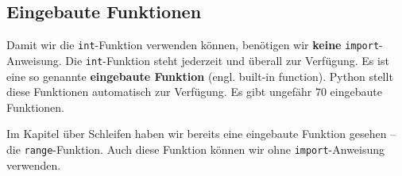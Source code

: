 \subsection{Eingebaute Funktionen}

Damit wir die \lstinline[language={python3}]{int}-Funktion verwenden können, benötigen wir \textbf{keine} \lstinline[language={python3}]{import}-Anweisung. Die \lstinline[language={python3}]{int}-Funktion steht jederzeit und überall zur Verfügung. Es ist eine so genannte \textbf{eingebaute Funktion} (engl. built-in function). Python stellt diese Funktionen automatisch zur Verfügung. Es gibt ungefähr \num{70} eingebaute Funktionen.

\begin{hinweis}
Im Kapitel über Schleifen haben wir bereits eine eingebaute Funktion gesehen -- die \lstinline[language={python3}]{range}-Funktion. Auch diese Funktion können wir ohne \lstinline[language={python3}]{import}-Anweisung verwenden.
\end{hinweis}

